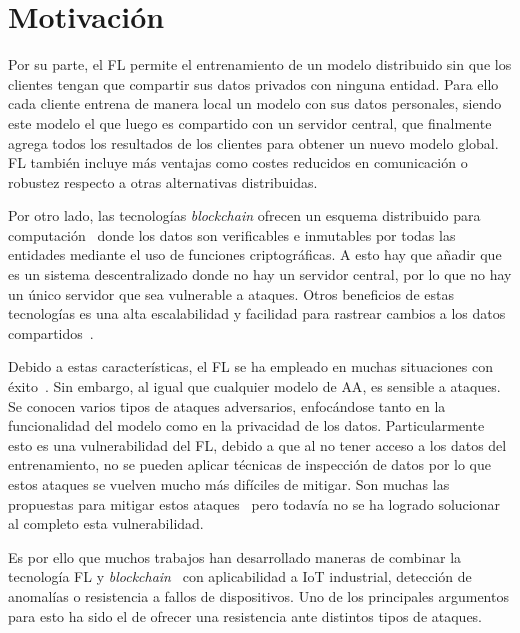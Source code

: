 \section{Motivación}

Por su parte, el \ac{FL} permite el entrenamiento de un modelo distribuido sin que los clientes tengan que compartir sus datos privados con ninguna entidad. Para ello cada cliente entrena de manera local un modelo con sus datos personales, siendo este modelo el que luego es compartido con un servidor central, que finalmente agrega todos los resultados de los clientes para obtener un nuevo modelo global. \ac{FL} también incluye más ventajas como costes reducidos en comunicación o robustez respecto a otras alternativas distribuidas.

Por otro lado, las tecnologías \textit{blockchain} ofrecen un esquema distribuido para computación~\cite{duc-2023} donde los datos son verificables e inmutables por todas las entidades mediante el uso de funciones criptográficas. A esto hay que añadir que es un sistema descentralizado donde no hay un servidor central, por lo que no hay un único servidor que sea vulnerable a ataques. Otros beneficios de estas tecnologías es una alta escalabilidad y facilidad para rastrear cambios a los datos compartidos~\cite{survey-blockchain}.

Debido a estas características, el \ac{FL} se ha empleado en muchas situaciones con éxito~\cite{tutorial-nuria}. Sin embargo, al igual que cualquier modelo de \ac{AA}, es sensible a ataques. Se conocen varios tipos de ataques adversarios, enfocándose tanto en la funcionalidad del modelo como en la privacidad de los datos. Particularmente esto es una vulnerabilidad del \ac{FL}, debido a que al no tener acceso a los datos del entrenamiento, no se pueden aplicar técnicas de inspección de datos por lo que estos ataques se vuelven mucho más difíciles de mitigar. Son muchas las propuestas para mitigar estos ataques~\cite{survey-nuria-2023} pero todavía no se ha logrado solucionar al completo esta vulnerabilidad.

Es por ello que muchos trabajos han desarrollado maneras de combinar la tecnología \ac{FL} y \textit{blockchain}~\cite{kim-2020-blockfl, qu-2021-pofl, zhu-2023-blockfed} con aplicabilidad a \ac{IoT} industrial, detección de anomalías o resistencia a fallos de dispositivos. Uno de los principales argumentos para esto ha sido el de ofrecer una resistencia ante distintos tipos de ataques.

